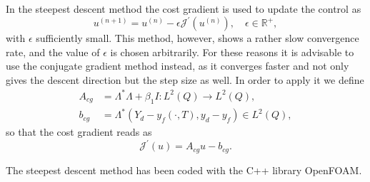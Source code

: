 \documentclass[12pt,a4paper]{article}
\newcommand{\LomT}{L^2 \left( \Omega \times \left( 0 , T \right) \right)}
\theoremstyle{plain}
\theoremstyle{definition}
\begin{document}
In the steepest descent method the cost gradient is used to update the control as
%
\begin{equation*}
u^{\left( n + 1 \right)} = u^{\left( n \right)} - \epsilon \mathcal{J}^\prime \left( u^{\left( n \right)} \right), \quad \epsilon \in \mathbb{R}^+,
\end{equation*}
%
with $\epsilon$ sufficiently small. This method, however, shows a rather slow convergence rate, and the value of $\epsilon$ is chosen arbitrarily. For these reasons it is advisable to use the conjugate gradient method instead, as it converges faster and not only gives the descent direction but the step size as well. In order to apply it we define
%
\begin{align*}
A_{cg} & = \Lambda^* \Lambda + \beta_1 I : L^2\left(Q \right) \rightarrow L^2\left(Q \right), \\
b_{cg} & = \Lambda^*\left( Y_d - y_f \left( \cdot, T \right), y_d - y_f \right) \in L^2\left(Q \right),
\end{align*}
%
so that the cost gradient reads as
%
\begin{equation*}
\mathcal{J}^\prime \left( u \right) = A_{cg} u - b_{cg}.
\end{equation*}

The steepest descent method has been coded with the C++ library OpenFOAM.

\iffalse

\begin{algorithm}[H]
\caption{Optimal control of the Heat Equation with the Conjugate Gradient Method}\label{CGalgorithm}
\begin{algorithmic}[1]
\Require $y_D$, $y_N$, $y_0$, $u^{\left(0\right)}$, $\beta_1$, $\beta_2$, $\beta_3$, $y_d$, $Y_d$, $tol$
\State $n \gets 0 $
\State compute the control-free solution by solving \eqref{eq:heatOptyfPDE}, $y_f$
\State $b \gets \Lambda^*\left( Y_d - y_f \left( \cdot, T \right), y_d - y_f \right)$
\State $\left( z \left( \cdot, T \right), z \right)  \gets \Lambda u$
\State $g \gets \Lambda^*\left( z \left( \cdot, T \right), z \right) + \beta_1 u - b$
\State $h \gets \|g\|^2_{\LomT}$
\State $h_a \gets h$
\State $r \gets -g$
\While{$\|r\|_{\LomT} > tol $}
\State $\left( z \left( \cdot, T \right), z \right) \gets \Lambda r$
\State $w \gets \Lambda^*\left( z \left( \cdot, T \right), z \right) + \beta_1 r$
\State $\alpha \gets \displaystyle \frac{h}{\left(r,w\right)_{\LomT}}$
\State $u \gets u + \alpha r$
\State $g \gets g + \alpha w$
\State $h_a \gets h$
\State $h \gets  \|g\|^2_{\LomT}$
\State $\gamma \gets \displaystyle \frac{h}{h_a}$
\State $r \gets -g + \gamma r$
\State $n \gets n + 1$
\EndWhile

\end{algorithmic}
\end{algorithm}

\fi
\end{document}
